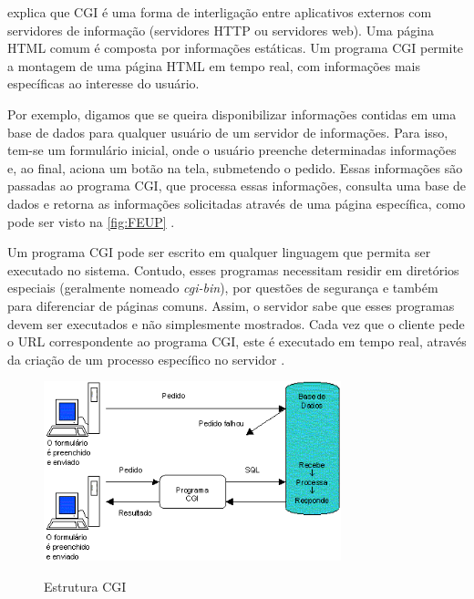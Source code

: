  explica que CGI é uma forma de interligação entre aplicativos externos com servidores de informação (servidores HTTP ou servidores web). Uma página HTML comum é composta por informações estáticas. Um programa CGI permite a montagem de uma página HTML em tempo real, com informações mais específicas ao interesse do usuário.

Por exemplo, digamos que se queira disponibilizar informações contidas em uma base de dados para qualquer usuário de um servidor de informações. Para isso, tem-se um formulário inicial, onde o usuário preenche determinadas informações e, ao final, aciona um botão na tela, submetendo o pedido. Essas informações são passadas ao programa CGI, que processa essas informações, consulta uma base de dados e retorna as informações solicitadas através de uma página específica, como pode ser visto na \autoref{fig:FEUP} \cite{apache:corte}.

Um programa CGI pode ser escrito em qualquer linguagem que permita ser executado no sistema. Contudo, esses programas necessitam residir em diretórios especiais (geralmente nomeado \textit{cgi-bin}), por questões de segurança e também para diferenciar de páginas comuns. Assim, o servidor sabe que esses programas devem ser executados e não simplesmente mostrados. Cada vez que o cliente pede o URL correspondente ao programa CGI, este é executado em tempo real, através da criação de um processo específico no servidor \cite{apache:corte}.

\begin{figure}[H]
    \centering
    \caption{Estrutura CGI}
    \includegraphics[width=0.77\textwidth]{./dados/figuras/fig11}
    \label{fig:FEUP}
\end{figure}
